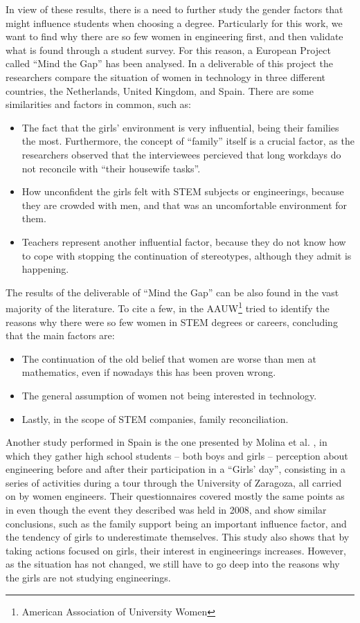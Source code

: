 \documentclass[journal,transmag]{IEEEtran}
\begin{document}
In view of these results, there is a need to further study the gender factors that might influence students when choosing a degree. Particularly for this work, we want to find why there are so few women in engineering first, and then validate what is found through a student survey. For this reason, a European Project called ``Mind the Gap'' has been analysed. In a deliverable of this project \cite{mtg2015} the researchers compare the situation of women in technology in three different countries, the Netherlands, United Kingdom, and Spain.
There are some similarities and factors in common, such as: 
\begin{itemize}
	\item The fact that the girls' environment is very influential, being their families the most. Furthermore, the concept of ``family'' itself is a crucial factor, as the researchers observed that the interviewees percieved that long workdays do not reconcile with ``their housewife tasks''.
	\item How unconfident the girls felt with STEM subjects or engineerings, because they are crowded with men, and that was an uncomfortable environment for them.
	\item Teachers represent another influential factor, because they do not know how to cope with stopping the continuation of stereotypes, although they admit is happening.
\end{itemize}

The results of the deliverable of ``Mind the Gap'' can be also found in the vast majority of the literature. To cite a few, in \cite{hill2010so} the AAUW\footnote{American Association of University Women} tried to identify the reasons why there were so few women in STEM degrees or careers, concluding that the main factors are:

\begin{itemize}
	\item The continuation of the old belief that women are worse than men at mathematics, even if nowadays this has been proven wrong.
	\item The general assumption of women not being interested in technology.
	\item Lastly, in the scope of STEM companies, family reconciliation.
\end{itemize}

Another study performed in Spain is the one presented by Molina et al. \cite{molina2010perception}, in which they gather high school students -- both boys and girls -- perception about engineering before and after their participation in a ``Girls' day'', consisting in a series of activities during a tour through the University of Zaragoza, all carried on by women engineers. Their questionnaires covered mostly the same points as in \cite{everis2012} even though the event they described was held in 2008, and show similar conclusions, such as the family support being an important influence factor, and the tendency of girls to underestimate themselves. This study also shows that by taking actions focused on girls, their interest in engineerings increases. However, as the situation has not changed, we still have to go deep into the reasons why the girls are not studying engineerings.
\end{document}
